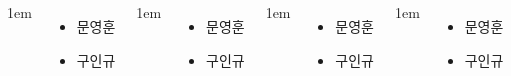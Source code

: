 \documentclass[	20pt, 
							a1paper, 
							portrait, %
							margin=0mm, %
							innermargin=10mm,  		%
							colspace=5mm, 
							subcolspace=0mm
							]{tikzposter}
\begin{document}
\begin{columns}
			{
					\setlength{\leftmargini}{4em}
					\setlength{\labelsep} {1em}
					\begin{itemize}
					\item  문영훈 
					\item  구인규 
					\end{itemize}
			} %


			{
					\setlength{\leftmargini}{4em}
					\setlength{\labelsep} {1em}
					\begin{itemize}
					\item  문영훈 
					\item  구인규 
					\end{itemize}
			} %


			{
					\setlength{\leftmargini}{4em}
					\setlength{\labelsep} {1em}
					\begin{itemize}
					\item  문영훈 
					\item  구인규 
					\end{itemize}
			} %

			{
					\setlength{\leftmargini}{4em}
					\setlength{\labelsep} {1em}
					\begin{itemize}
					\item  문영훈 
					\item  구인규 
					\end{itemize}
			} %




	\end{columns}
\end{document}
